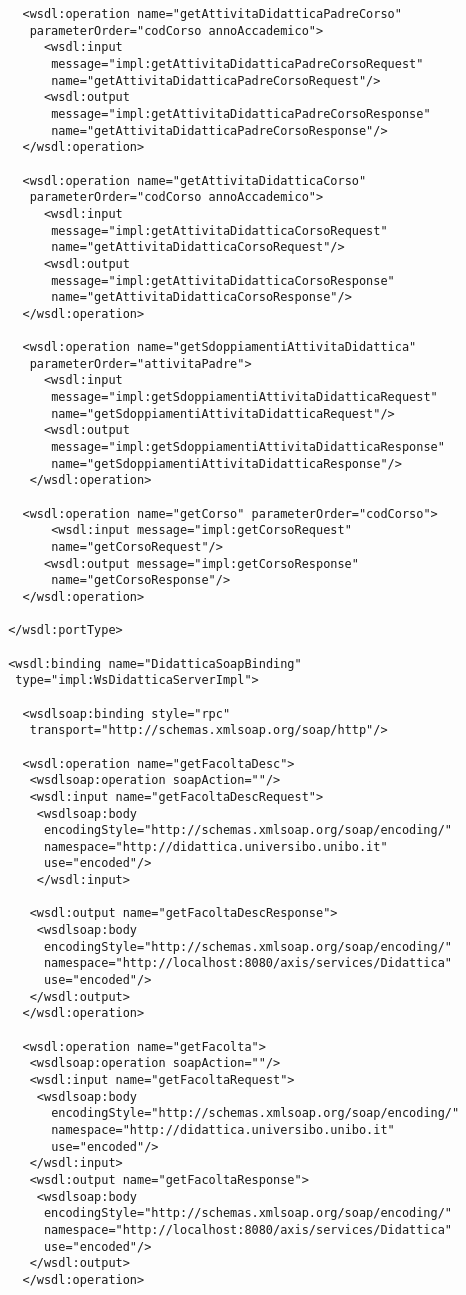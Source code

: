 \begin{small}
\begin{verbatim}
   <wsdl:operation name="getAttivitaDidatticaPadreCorso"
    parameterOrder="codCorso annoAccademico">
      <wsdl:input
       message="impl:getAttivitaDidatticaPadreCorsoRequest"
       name="getAttivitaDidatticaPadreCorsoRequest"/>
      <wsdl:output
       message="impl:getAttivitaDidatticaPadreCorsoResponse"
       name="getAttivitaDidatticaPadreCorsoResponse"/>
   </wsdl:operation>

   <wsdl:operation name="getAttivitaDidatticaCorso"
    parameterOrder="codCorso annoAccademico">
      <wsdl:input
       message="impl:getAttivitaDidatticaCorsoRequest"
       name="getAttivitaDidatticaCorsoRequest"/>
      <wsdl:output
       message="impl:getAttivitaDidatticaCorsoResponse"
       name="getAttivitaDidatticaCorsoResponse"/>
   </wsdl:operation>

   <wsdl:operation name="getSdoppiamentiAttivitaDidattica"
    parameterOrder="attivitaPadre">
      <wsdl:input
       message="impl:getSdoppiamentiAttivitaDidatticaRequest"
       name="getSdoppiamentiAttivitaDidatticaRequest"/>
      <wsdl:output
       message="impl:getSdoppiamentiAttivitaDidatticaResponse"
       name="getSdoppiamentiAttivitaDidatticaResponse"/>
    </wsdl:operation>

   <wsdl:operation name="getCorso" parameterOrder="codCorso">
       <wsdl:input message="impl:getCorsoRequest"
       name="getCorsoRequest"/>
      <wsdl:output message="impl:getCorsoResponse"
       name="getCorsoResponse"/>
   </wsdl:operation>

 </wsdl:portType>

 <wsdl:binding name="DidatticaSoapBinding"
  type="impl:WsDidatticaServerImpl">

   <wsdlsoap:binding style="rpc"
    transport="http://schemas.xmlsoap.org/soap/http"/>

   <wsdl:operation name="getFacoltaDesc">
    <wsdlsoap:operation soapAction=""/>
    <wsdl:input name="getFacoltaDescRequest">
     <wsdlsoap:body
      encodingStyle="http://schemas.xmlsoap.org/soap/encoding/"
      namespace="http://didattica.universibo.unibo.it"
      use="encoded"/>
     </wsdl:input>

    <wsdl:output name="getFacoltaDescResponse">
     <wsdlsoap:body
      encodingStyle="http://schemas.xmlsoap.org/soap/encoding/"
      namespace="http://localhost:8080/axis/services/Didattica"
      use="encoded"/>
    </wsdl:output>
   </wsdl:operation>

   <wsdl:operation name="getFacolta">
    <wsdlsoap:operation soapAction=""/>
    <wsdl:input name="getFacoltaRequest">
     <wsdlsoap:body
       encodingStyle="http://schemas.xmlsoap.org/soap/encoding/"
       namespace="http://didattica.universibo.unibo.it" 
       use="encoded"/>
    </wsdl:input>
    <wsdl:output name="getFacoltaResponse">
     <wsdlsoap:body 
      encodingStyle="http://schemas.xmlsoap.org/soap/encoding/"
      namespace="http://localhost:8080/axis/services/Didattica"
      use="encoded"/>
    </wsdl:output>
   </wsdl:operation>


\end{verbatim}
\end{small}
